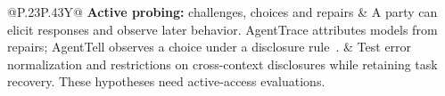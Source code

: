 \begin{table}[t]
\begin{tabularx}{\textwidth}{@{}P{.23\textwidth}P{.43\textwidth}Y@{}}
\textbf{Active probing:} challenges, choices and repairs & A party can elicit responses and observe later behavior. AgentTrace attributes models from repairs; AgentTell observes a choice under a disclosure rule~\cite{zhao2026agenttrace,shahriar2026agenttell}. & Test error normalization and restrictions on cross-context disclosures while retaining task recovery. These hypotheses need active-access evaluations. \\
\bottomrule\end{tabularx}\end{table}
